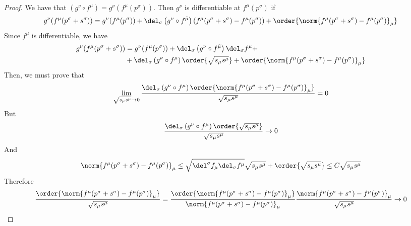\documentclass[../mmf.tex]{subfiles}
\begin{document}
\begin{proof}
	We have that $\left(g^\nu\circ f^\mu\right)=g^\nu(f^\mu(p^\sigma))$. Then $g^\nu$ is differentiable at $f^\mu(p^\sigma)$ if
	\begin{equation*}
			g^\nu(f^\mu(p^\sigma+s^\sigma))=g^\nu(f^\mu(p^\sigma))+\del_\sigma\left( g^\nu\circ f^{\tilde{\mu}}\right)\left( f^\mu(p^\sigma+s^\sigma)-f^\mu(p^\sigma) \right)+\order{\norm{f^\mu(p^\sigma+s^\sigma)-f^\mu(p^\sigma)}_\mu}
	\end{equation*}
	Since $f^\mu$ is differentiable, we have
	\begin{equation*}%
		\begin{aligned}
			g^\nu(f^\mu(p^\sigma+s^\sigma))&=g^\nu(f^\mu(p^\sigma))+\del_\sigma\left(g^\nu\circ f^{\tilde{\mu}}\right)\del_\sigma f^\mu+\\
			&+\del_\sigma\left(g^\nu\circ f^\mu\right)\order{\sqrt{s_\mu s^\mu}}+\order{\norm{f^\mu(p^\sigma+s^\sigma)-f^\mu(p^\sigma)}_\mu}
		\end{aligned}
	\end{equation*}
	Then, we must prove that
	\begin{equation*}
		\lim_{\sqrt{s_\mu s^\mu}\to0}\frac{\del_\sigma\left(g^\nu\circ f^\mu\right)\order{\norm{f^\mu(p^\sigma+s^\sigma)-f^\mu(p^\sigma)}_\mu}}{\sqrt{s_\mu s^\mu}}=0
	\end{equation*}
	But
	\begin{equation*}
		\frac{\del_\sigma\left( g^\nu\circ f^\mu \right)\order{\sqrt{s_\mu s^\mu}}}{\sqrt{s_\mu s^\mu}}\to0	\end{equation*}
	And
	\begin{equation*}
		\norm{f^\mu(p^\sigma+s^\sigma)-f^\mu(p^\sigma)}_\mu\le\sqrt{\del^\sigma f_\mu\del_\sigma f^\mu}\sqrt{s_\mu s^\mu}+\order{\sqrt{s_\mu s^\mu}}\le C\sqrt{s_\mu s^\mu}
	\end{equation*}
	Therefore
	\begin{equation*}
		\frac{\order{\norm{f^\mu(p^\sigma+s^\sigma)-f^\mu(p^\sigma)}_\mu}}{\sqrt{s_\mu s^\mu}}=\frac{\order{\norm{f^\mu(p^\sigma+s^\sigma)-f^\mu(p^\sigma)}_\mu}}{\norm{f^\mu(p^\sigma+s^\sigma)-f^\mu(p^\sigma)}_\mu}\frac{\norm{f^\mu(p^\sigma+s^\sigma)-f^\mu(p^\sigma)}_\mu}{\sqrt{s_\mu s^\mu}}\to0
	\end{equation*}
\end{proof}
\end{document}
